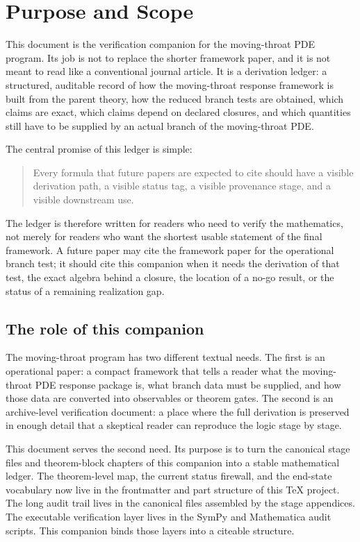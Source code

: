 \chapter{Purpose and Scope}
\label{chap:purpose-scope}

This document is the verification companion for the moving-throat PDE program.  Its job is not to replace the shorter framework paper, and it is not meant to read like a conventional journal article.  It is a derivation ledger: a structured, auditable record of how the moving-throat response framework is built from the parent theory, how the reduced branch tests are obtained, which claims are exact, which claims depend on declared closures, and which quantities still have to be supplied by an actual branch of the moving-throat PDE.

The central promise of this ledger is simple:
\begin{quote}
Every formula that future papers are expected to cite should have a visible derivation path, a visible status tag, a visible provenance stage, and a visible downstream use.
\end{quote}

The ledger is therefore written for readers who need to verify the mathematics, not merely for readers who want the shortest usable statement of the final framework.  A future paper may cite the framework paper for the operational branch test; it should cite this companion when it needs the derivation of that test, the exact algebra behind a closure, the location of a no-go result, or the status of a remaining realization gap.

\section{The role of this companion}

The moving-throat program has two different textual needs.  The first is an operational paper: a compact framework that tells a reader what the moving-throat PDE response package is, what branch data must be supplied, and how those data are converted into observables or theorem gates.  The second is an archive-level verification document: a place where the full derivation is preserved in enough detail that a skeptical reader can reproduce the logic stage by stage.

This document serves the second need.  Its purpose is to turn the canonical
stage files and theorem-block chapters of this companion into a stable
mathematical ledger.  The theorem-level map, the current status firewall, and
the end-state vocabulary now live in the frontmatter and part structure of this
\TeX{} project.  The long audit trail lives in the canonical
 files assembled by the stage appendices.
The executable verification layer lives in the SymPy and Mathematica audit
scripts.  This companion binds those layers into a citeable structure.


